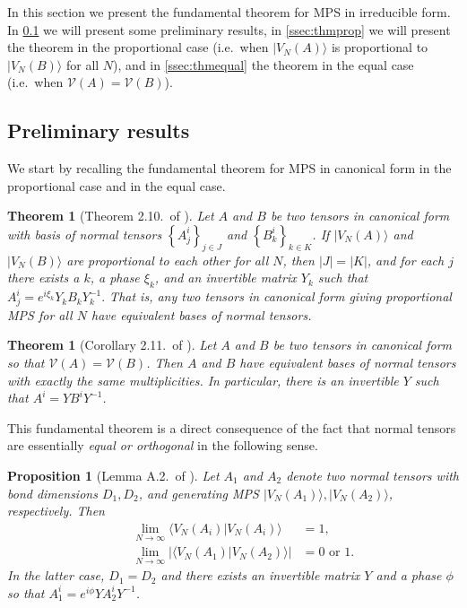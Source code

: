 \documentclass[pra,a4paper,notitlepage,nofootinbib,superscriptaddress]{revtex4-1}
\theoremstyle{plain}
\newtheorem{theorem}[lemma]{Theorem}
\newtheorem{proposition}[lemma]{Proposition}
\newcommand{\1}{{\openone}}
\newcommand{\ra}{\rangle}
\newcommand{\la}{\langle}
\newcommand{\mc}{\mathcal}
\begin{document}
In this section we present the fundamental theorem for MPS in irreducible form.
In \cref{ssec:prelim} we will present some preliminary results,
in \cref{ssec:thmprop} we will present the theorem in  the proportional case (i.e.\ when $|V_N(A)\ra$ is proportional to $|V_N(B)\ra$ for all $N$), and in
\cref{ssec:thmequal} the theorem in the equal case  (i.e.\ when $\mc{V}(A)=\mc{V}(B)$).

\subsection{Preliminary results}
\label{ssec:prelim}

We start by recalling the fundamental theorem for MPS in canonical form in the proportional case and in the equal case.


\begin{theorem}[Theorem 2.10.\ of \cite{Ci15}]
    \label{thm:cf}
    Let $A$ and $B$ be two tensors in canonical form with basis of normal tensors
    $\left\{A_j^i\right\}_{j\in J}$ and
    $\left\{B_k^i\right\}_{k\in K}$.
    If
    $|V_N(A)\ra$ and  $|V_N(B)\ra$ are proportional to each other for all $N$,
    then $|J|=|K|$,
    and for each $j$ there exists a $k$, a phase $\xi_k$, and an invertible  matrix $Y_k$ such that
    $A_j^i = e^{i\xi_k}Y_k B_k Y_k^{-1}.$
    That is, any two tensors in canonical form giving proportional MPS for all $N$ have equivalent bases of normal tensors.
\end{theorem}


\begin{theorem}[Corollary 2.11.\ of \cite{Ci15}] \label{cor:cfequal}
    Let $A$ and $B$ be two tensors in canonical form so that $\mc{V}(A) = \mc{V}(B)$.
    Then $A$ and $B$ have equivalent bases of normal tensors with exactly the same multiplicities. In particular, there is an invertible $Y$ such that
    $A^i = YB^i Y^{-1}$.
\end{theorem}

This fundamental theorem is a direct consequence of the fact that normal
tensors are essentially {\it equal or orthogonal} in the following sense.

\begin{proposition}[Lemma  A.2.\ of \cite{Ci15}] \label{equal-or-orthogonal}
    Let $A_1$ and $A_2$ denote two normal tensors with bond dimensions $D_1, D_2$, and generating MPS $|V_N(A_1)\ra, |V_N(A_2)\ra$, respectively.
    Then
    \begin{subequations}
        \begin{align}
             & &\lim_{N\to\infty} \la V_N(A_i) |V_N(A_i)\rangle   &=1,\\
            \label{scprod}
             & &\lim_{N\to\infty} |\langle V_N(A_1)|V_N(A_2)\ra | &=0 \text{ or } 1.
        \end{align}
    \end{subequations}
    In the latter case, $D_1=D_2$ and there exists an invertible matrix $Y$ and a phase $\phi$ so that $A_1^i= e^{i\phi} Y  A_2^i  Y^{-1}$.
\end{proposition}
\end{document}
